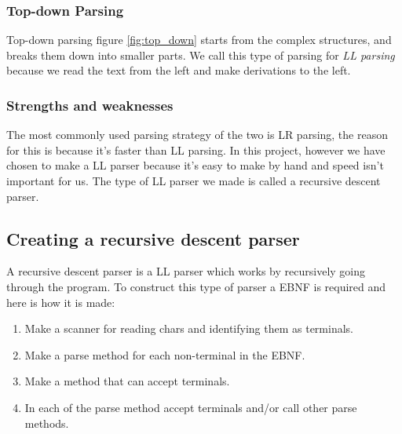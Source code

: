 		\subsubsection*{Top-down Parsing}
			Top-down parsing figure \ref{fig:top_down} starts from the complex structures, and breaks them down into smaller parts.
			We call this type of parsing for {\it LL parsing} because we read the text from the left and make derivations to the left.
		
		\subsubsection*{Strengths and weaknesses}
			The most commonly used parsing strategy of the two is LR parsing, the reason for this is because it's faster than LL parsing.
			In this project, however we have chosen to make a LL parser because it's easy to make by hand and speed isn't important for us. 
			The type of LL parser we made is called a recursive descent parser.
			
	\subsection{Creating a recursive descent parser}
		A recursive descent parser is a LL parser which works by recursively going through the program.
		To construct this type of parser a EBNF is required and here is how it is made:
		\begin{enumerate}
			\item Make a scanner for reading chars and identifying them as terminals.
			\item Make a parse method for each non-terminal in the EBNF.
			\item Make a method that can accept terminals.
			\item In each of the parse method accept terminals and/or call other parse methods.
		\end{enumerate}		
	
		
		